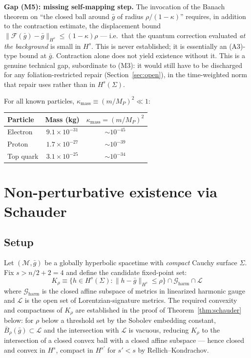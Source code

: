 \documentclass[12pt,a4paper]{article}
\begin{document}
\smallskip\noindent\textbf{Gap (M5): missing self-mapping step.}
The invocation of the Banach theorem on ``the closed ball around $\bar{g}$ of radius
$\rho/(1-\kappa)$'' requires, in addition to the contraction estimate, the displacement
bound $\|\mathcal{F}(\bar{g}) - \bar{g}\|_{H^s} \leq (1-\kappa)\rho$ --- i.e.\ that the
quantum correction evaluated \emph{at the background} is small in $H^s$. This is never
established; it is essentially an (A3)-type bound at $\bar{g}$. Contraction alone does
not yield existence without it. This is a genuine technical gap, subordinate to (M3): it
would still have to be discharged for any foliation-restricted repair (Section~\ref{sec:open}),
in the time-weighted norm that repair uses rather than in $H^s(\Sigma)$.

\medskip

For all known particles, $\kappa_{\text{mass}} \equiv (m/M_P)^2 \ll 1$:
\begin{center}
\begin{tabular}{lcc}
\toprule
Particle & Mass (kg) & $\kappa_{\text{mass}} = (m/M_P)^2$ \\
\midrule
Electron & $9.1\times10^{-31}$ & $\sim 10^{-45}$ \\
Proton & $1.7\times10^{-27}$ & $\sim 10^{-39}$ \\
Top quark & $3.1\times10^{-25}$ & $\sim 10^{-34}$ \\
\bottomrule
\end{tabular}
\end{center}

\section{Non-perturbative existence via Schauder}
\label{sec:schauder}

\subsection{Setup}

Let $(\mathcal{M},\bar{g})$ be a globally hyperbolic spacetime with \emph{compact} Cauchy
surface $\Sigma$. Fix $s > n/2 + 2 = 4$ and define the candidate fixed-point set:
\begin{equation}
K_\rho \equiv \bigl\{h \in H^s(\Sigma) : \|h-\bar{g}\|_{H^s} \leq \rho\bigr\}
\cap \mathcal{G}_{\text{harm}} \cap \mathcal{L}
\label{eq:K_rho}
\end{equation}
where $\mathcal{G}_{\text{harm}}$ is the closed affine subspace of metrics in linearized
harmonic gauge and $\mathcal{L}$ is the open set of Lorentzian-signature metrics. The
required convexity and compactness of $K_\rho$ are established in the proof of
Theorem~\ref{thm:schauder} below: for $\rho$ below a threshold set by the Sobolev
embedding constant, $\overline{B}_\rho(\bar{g}) \subset \mathcal{L}$ and the intersection
with $\mathcal{L}$ is vacuous, reducing $K_\rho$ to the intersection of a closed convex
ball with a closed affine subspace — hence closed and convex in $H^s$, compact in
$H^{s'}$ for $s' < s$ by Rellich--Kondrachov.
\end{document}
